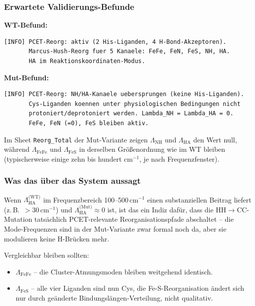 \documentclass[11pt,a4paper,twoside]{article}
\theoremstyle{remark}
\begin{document}
\subsubsection*{Erwartete Validierungs-Befunde}

\textbf{WT-Befund:}

\begin{lstlisting}[style=bash]
[INFO] PCET-Reorg: aktiv (2 His-Liganden, 4 H-Bond-Akzeptoren).
       Marcus-Hush-Reorg fuer 5 Kanaele: FeFe, FeN, FeS, NH, HA.
       HA im Reaktionskoordinaten-Modus.
\end{lstlisting}

\textbf{Mut-Befund:}

\begin{lstlisting}[style=bash]
[INFO] PCET-Reorg: NH/HA-Kanaele uebersprungen (keine His-Liganden).
       Cys-Liganden koennen unter physiologischen Bedingungen nicht
       protoniert/deprotoniert werden. Lambda_NH = Lambda_HA = 0.
       FeFe, FeN (=0), FeS bleiben aktiv.
\end{lstlisting}

Im Sheet \texttt{Reorg\_Total} der Mut-Variante zeigen
$\Lambda_\text{NH}$ und $\Lambda_\text{HA}$ den Wert null, w\"ahrend
$\Lambda_\text{FeFe}$ und $\Lambda_\text{FeS}$ in derselben
Gr\"o{\ss}enordnung wie im WT bleiben (typischerweise einige zehn bis
hundert cm$^{-1}$, je nach Frequenzfenster).

\subsubsection*{Was das \"uber das System aussagt}

Wenn $\Lambda_\text{HA}^\text{(WT)}$ im Frequenzbereich 100--500\,cm$^{-1}$
einen substanziellen Beitrag liefert (z.\,B.\ $> 30$\,cm$^{-1}$) und
$\Lambda_\text{HA}^\text{(Mut)} \approx 0$ ist, ist das ein Indiz
daf\"ur, dass die HH$\to$CC-Mutation tats\"achlich PCET-relevante
Reorganisationspfade abschaltet -- die Mode-Frequenzen sind in der
Mut-Variante zwar formal noch da, aber sie modulieren keine
H-Br\"ucken mehr.

Vergleichbar bleiben sollten:
\begin{itemize}
  \item $\Lambda_\text{FeFe}$ -- die Cluster-Atmungsmoden bleiben
        weitgehend identisch.
  \item $\Lambda_\text{FeS}$ -- alle vier Liganden sind nun Cys, die
        Fe-S-Reorganisation \"andert sich nur durch ge\"anderte
        Bindungsl\"angen-Verteilung, nicht qualitativ.
\end{itemize}
\end{document}
